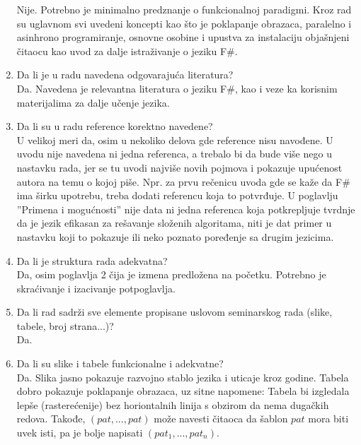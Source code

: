 \documentclass[a4paper]{report}
\begin{document}
\begin{enumerate}
Nije. Potrebno je minimalno predznanje o funkcionalnoj paradigmi.
Kroz rad su uglavnom svi uvedeni koncepti kao što je poklapanje obrazaca,
paralelno i asinhrono programiranje, osnovne osobine i upustva za instalaciju
objašnjeni čitaocu kao uvod za dalje istraživanje o jeziku F\#.

\item Da li je u radu navedena odgovarajuća literatura?\\

Da. Navedena je relevantna literatura o jeziku F\#, kao i veze ka korisnim
materijalima za dalje učenje jezika.

\item Da li su u radu reference korektno navedene?\\

U velikoj meri da, osim u nekoliko delova gde reference nisu navođene.
U uvodu nije navedena ni jedna referenca, a trebalo bi da bude više nego u nastavku rada, 
jer se tu uvodi najviše novih pojmova i pokazuje upućenost autora na temu o kojoj piše. 
Npr. za prvu rečenicu uvoda gde se kaže da F\# ima širku upotrebu, 
treba dodati referencu koja to potvrđuje. 
U poglavlju ''Primena i mogućnosti'' nije data ni jedna referenca
koja potkrepljuje tvrdnje da je jezik efikasan za rešavanje složenih algoritama,
niti je dat primer u nastavku koji to pokazuje ili neko poznato poređenje sa drugim jezicima.

\item Da li je struktura rada adekvatna?\\

Da, osim poglavlja 2 čija je izmena predložena na početku. Potrebno je skraćivanje
i izacivanje potpoglavlja.

\item Da li rad sadrži sve elemente propisane uslovom seminarskog rada (slike, tabele, broj strana...)?\\

Da.\\

\item Da li su slike i tabele funkcionalne i adekvatne?\\

Da. Slika jasno pokazuje razvojno stablo jezika i uticaje kroz godine.
Tabela dobro pokazuje poklapanje obrazaca, uz sitne napomene: 
Tabela bi izgledala lepše (rasterećenije) bez horiontalnih linija 
s obzirom da nema dugačkih redova. 
Takođe, $(pat, ... ,pat)$ može navesti čitaoca da šablon $pat$ mora biti uvek isti, pa je bolje napisati $(pat_1, ... ,pat_n)$.

\end{enumerate}
\end{document}
